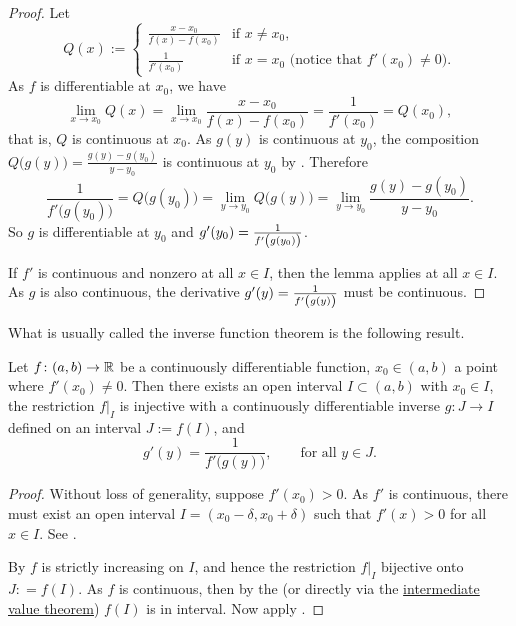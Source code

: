 \begin{proof}
Let
\begin{equation*}
Q(x) :=
\begin{cases}
\frac{x-x_0}{f(x)-f(x_0)} & \text{if $x \neq x_0$,} \\
\frac{1}{f'(x_0)} & \text{if $x = x_0$ (notice that $f'(x_0) \neq 0$).}
\end{cases}
\end{equation*}
As $f$ is differentiable at $x_0$, 
we have
\begin{equation*}
\lim_{x \to x_0} Q(x) =
\lim_{x \to x_0} 
\frac{x-x_0}{f(x)-f(x_0)} 
=
\frac{1}{f'(x_0)}
=
Q(x_0) ,
\end{equation*}
that is, $Q$ is continuous at $x_0$.
As $g(y)$ is continuous at $y_0$,
the composition $Q\bigl(g(y)\bigr) = \frac{g(y)-g(y_0)}{y-y_0}$
is continuous at $y_0$ by
.
Therefore
\begin{equation*}
\frac{1}{f'\bigl(g(y_0)\bigr)}
= Q\bigl(g(y_0)\bigr)
= \lim_{y \to y_0} Q\bigl(g(y)\bigr)
= \lim_{y \to y_0} \frac{g(y)-g(y_0)}{y-y_0} .
\end{equation*}
So $g$ is differentiable at $y_0$ and $g'(y_0) =
\frac{1}{f'\left(\vphantom{1^1_1}g(y_0)\right)}$.

If $f'$ is continuous and nonzero at all $x \in I$,
then the lemma applies at all $x \in I$.  As $g$ is also
continuous, the derivative $g'(y) =
\frac{1}{f'\left(\vphantom{1^1_1}g(y)\right)}$ must be continuous.
\end{proof}

What is usually called the inverse function theorem is the following result.

\begin{thm}
Let $f \colon (a,b) \to {\mathbb{R}}$ be a continuously differentiable function,
$x_0 \in (a,b)$ a point where $f'(x_0) \not= 0$.  Then there exists
an open interval $I \subset (a,b)$ with $x_0 \in I$, the
restriction $f|_{I}$ is injective with a continuously differentiable inverse
$g \colon J \to I$ defined on an interval $J := f(I)$,
and
\begin{equation*}
g'(y) = \frac{1}{f'\bigl( g(y) \bigr)} , \qquad \text{for all $y \in J$}.
\end{equation*}
\end{thm}

\begin{proof}
Without loss of generality, suppose $f'(x_0) > 0$.  As $f'$ is
continuous, there must exist an open interval $I = (x_0-\delta,x_0+\delta)$ 
such that $f'(x) > 0$ for all $x \in I$.  See
.

By  $f$ is strictly increasing
on $I$, and hence the restriction $f|_{I}$ bijective onto $J: = f(I)$.
As $f$ is continuous,
then by the
(or directly via the
\hyperref[IVT:thm]{intermediate value theorem})
$f(I)$ is in interval.
Now apply .
\end{proof}


